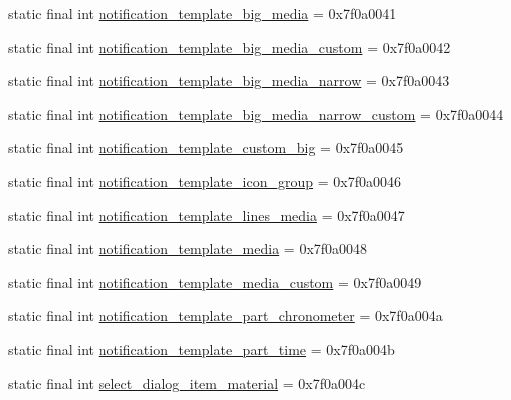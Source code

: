 \begin{DoxyCompactItemize}
\item 
static final int \mbox{\hyperlink{classandroid_1_1support_1_1design_1_1R_1_1layout_a937801124bdcdd939ce59fe3913a9762}{notification\+\_\+template\+\_\+big\+\_\+media}} = 0x7f0a0041
\item 
static final int \mbox{\hyperlink{classandroid_1_1support_1_1design_1_1R_1_1layout_ac48d0f30a65cf14a5d13026a68580c17}{notification\+\_\+template\+\_\+big\+\_\+media\+\_\+custom}} = 0x7f0a0042
\item 
static final int \mbox{\hyperlink{classandroid_1_1support_1_1design_1_1R_1_1layout_a85e748195c9daddc8bb8fe726a1a5da2}{notification\+\_\+template\+\_\+big\+\_\+media\+\_\+narrow}} = 0x7f0a0043
\item 
static final int \mbox{\hyperlink{classandroid_1_1support_1_1design_1_1R_1_1layout_ac5850f50d9b00b6d8bef8170ae46d560}{notification\+\_\+template\+\_\+big\+\_\+media\+\_\+narrow\+\_\+custom}} = 0x7f0a0044
\item 
static final int \mbox{\hyperlink{classandroid_1_1support_1_1design_1_1R_1_1layout_a3f655a0c29e0f05b1530f853466714d2}{notification\+\_\+template\+\_\+custom\+\_\+big}} = 0x7f0a0045
\item 
static final int \mbox{\hyperlink{classandroid_1_1support_1_1design_1_1R_1_1layout_af18dacccacfd30520ce9e95dffe3735c}{notification\+\_\+template\+\_\+icon\+\_\+group}} = 0x7f0a0046
\item 
static final int \mbox{\hyperlink{classandroid_1_1support_1_1design_1_1R_1_1layout_aff5e95253f828cd42a503893c4e9dd6e}{notification\+\_\+template\+\_\+lines\+\_\+media}} = 0x7f0a0047
\item 
static final int \mbox{\hyperlink{classandroid_1_1support_1_1design_1_1R_1_1layout_af6499fd4c261801e10b2e023556ceb2e}{notification\+\_\+template\+\_\+media}} = 0x7f0a0048
\item 
static final int \mbox{\hyperlink{classandroid_1_1support_1_1design_1_1R_1_1layout_a73930b457283d5321064a22320c07cb4}{notification\+\_\+template\+\_\+media\+\_\+custom}} = 0x7f0a0049
\item 
static final int \mbox{\hyperlink{classandroid_1_1support_1_1design_1_1R_1_1layout_adbf595dcbbe5468a640c75da765e94c5}{notification\+\_\+template\+\_\+part\+\_\+chronometer}} = 0x7f0a004a
\item 
static final int \mbox{\hyperlink{classandroid_1_1support_1_1design_1_1R_1_1layout_a207f018f5184f266fb707b3c42dff303}{notification\+\_\+template\+\_\+part\+\_\+time}} = 0x7f0a004b
\item 
static final int \mbox{\hyperlink{classandroid_1_1support_1_1design_1_1R_1_1layout_aab2090fcba37187805603c08746aa8cc}{select\+\_\+dialog\+\_\+item\+\_\+material}} = 0x7f0a004c

\end{DoxyCompactItemize}

